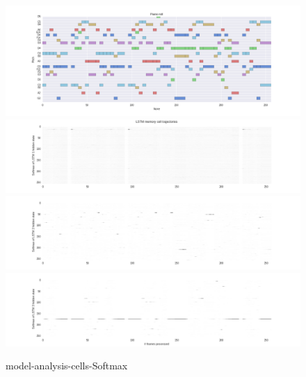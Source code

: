 \documentclass[dissertation.tex]{subfiles}
\begin{document}
\begin{figure}[htpb]
    \centering
    \includegraphics[width=1.0\linewidth]{Figures/model-analysis-cells-softmax-piano-roll.png}
    \includegraphics[width=1.0\linewidth]{Figures/model-analysis-cells-softmax-1.png}
    \includegraphics[width=1.0\linewidth]{Figures/model-analysis-cells-softmax-2.png}
    \includegraphics[width=1.0\linewidth]{Figures/model-analysis-cells-softmax-3.png}
    \caption{model-analysis-cells-Softmax}
    \label{fig:model-analysis-cells-softmax}
\end{figure}
\end{document}
